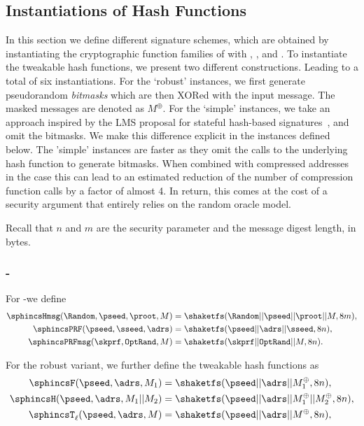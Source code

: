 

\subsection{Instantiations of Hash Functions}
\label{subsec:instanthash}
In this section we define different signature schemes, which are obtained
by instantiating the cryptographic function families of \spx with \shatwo,
\shathree, and \haraka. To instantiate the tweakable hash functions,
we present two different constructions. Leading to a total of six instantiations.
For the `robust' instances,
we first generate pseudorandom \emph{bitmasks}
which are then XORed with the input message. The masked messages are denoted
as $M^{\oplus}$.
For the `simple' instances, we take an approach inspired by the LMS proposal for stateful hash-based signatures~\cite{LMSdraft}, and omit the bitmasks.
We make this difference explicit in the instances defined below. The 'simple' instances
are faster as they omit the calls to the underlying hash function to generate bitmasks. When combined with compressed addresses in the \shatwo case this can lead to an estimated reduction of the number of
compression function calls by a factor of almost 4. In return, this comes at the cost of a
security argument that entirely relies on the random oracle model.

Recall that $n$ and $m$ are the security parameter and the message digest length, in bytes.

\subsubsection{\spx-\shathree}
   For \spx-\shathree we define
   \begin{equation}
      \begin{aligned}
         \sphincsHmsg(\Random,\pseed, \proot, M) &= \shaketfs(\Random || \pseed || \proot || M, 8m),\\
         \sphincsPRF(\pseed, \sseed, \adrs) &= \shaketfs(\pseed || \adrs || \sseed, 8n),\\
         \sphincsPRFmsg(\skprf, \texttt{OptRand}, M) &= \shaketfs(\skprf || \texttt{OptRand} || M, 8n).\\
      \end{aligned}
    \end{equation}

    For the robust variant, we further define the tweakable hash functions as
    \begin{equation}
      \begin{aligned}
         \sphincsF(\pseed, \adrs, M_1) &= \shaketfs(\pseed || \adrs || M_1^{\oplus}, 8n),\\
         \sphincsH(\pseed, \adrs, M_1 || M_2) &= \shaketfs(\pseed || \adrs || M_1^{\oplus} || M_2^{\oplus}, 8n),\\
         \sphincsT_\ell(\pseed, \adrs, M) &= \shaketfs(\pseed || \adrs || M^{\oplus}, 8n),\\
      \end{aligned}
    \end{equation}

